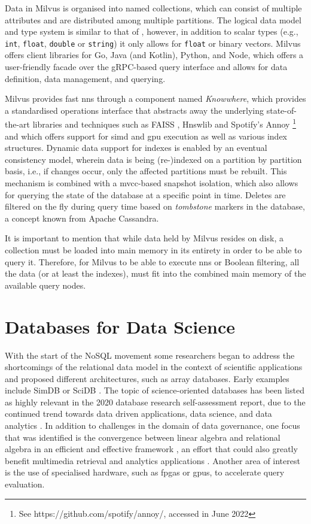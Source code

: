 Data in Milvus is organised into named collections, which can consist of multiple attributes and are distributed among multiple partitions. The logical data model and type system is similar to that of \cottontail{}, however, in addition to scalar types (e.g., \texttt{int}, \texttt{float}, \texttt{double} or \texttt{string}) it only allows for \texttt{float} or binary vectors. Milvus offers client libraries for Go, Java (and Kotlin), Python, and Node, which offers a user-friendly facade over the gRPC-based query interface and allows for data definition, data management, and querying.

Milvus provides fast \acrshort{nns} through a component named \emph{Knowwhere}, which provides a standardised operations interface that abstracts away the underlying state-of-the-art libraries and techniques such as FAISS \cite{Johnson:2019Billion}, Hnswlib \cite{Malkov:2018Efficient} and Spotify's Annoy \footnote{See https://github.com/spotify/annoy/, accessed in June 2022} and which offers support for \acrshort{simd} and \acrshort{gpu} execution as well as various index structures. Dynamic data support for indexes is enabled by an eventual consistency model, wherein data is being (re-)indexed on a partition by partition basis, i.e., if changes occur, only the affected partitions must be rebuilt. This mechanism is combined with a \acrshort{mvcc}-based snapshot isolation, which also allows for querying the state of the database at a specific point in time. Deletes are filtered on the fly during query time based on \emph{tombstone} markers in the database, a concept known from Apache Cassandra.

It is important to mention that while data held by Milvus resides on disk, a collection must be loaded into main memory in its entirety in order to be able to query it. Therefore, for Milvus to be able to execute \acrshort{nns} or Boolean filtering, all the data (or at least the indexes), must fit into the combined main memory of the available query nodes.

\section{Databases for Data Science}
With the start of the NoSQL movement some researchers began to address the shortcomings of the relational data model in the context of scientific applications and proposed different architectures, such as array databases. Early examples include SimDB \cite{Silva:2010SimDB} or SciDB \cite{Stonebraker:2011Architecture,Stonebraker:2013SciDB}. The topic of science-oriented databases has been listed as highly relevant in the 2020 database research self-assessment report, due to the continued trend towards data driven applications, data science, and data analytics \cite{Abadi:2020Seattle}. In addition to challenges in the domain of data governance, one focus that was identified is the convergence between linear algebra and relational algebra in an efficient and effective framework \cite{Luo:2018Scalable}, an effort that could also greatly benefit multimedia retrieval and analytics applications \cite{Berry:1995Using}. Another area of interest is the use of specialised hardware, such as \acrshort{fpga}s or \acrshort{gpu}s, to accelerate query evaluation.
 
